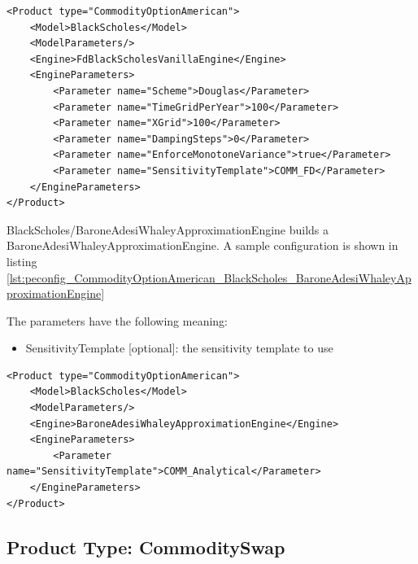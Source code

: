 \begin{longlisting}
\begin{verbatim}
<Product type="CommodityOptionAmerican">
    <Model>BlackScholes</Model>
    <ModelParameters/>
    <Engine>FdBlackScholesVanillaEngine</Engine>
    <EngineParameters>
        <Parameter name="Scheme">Douglas</Parameter>
        <Parameter name="TimeGridPerYear">100</Parameter>
        <Parameter name="XGrid">100</Parameter>
        <Parameter name="DampingSteps">0</Parameter>
        <Parameter name="EnforceMonotoneVariance">true</Parameter>
        <Parameter name="SensitivityTemplate">COMM_FD</Parameter>
    </EngineParameters>
</Product>
\end{verbatim}
\caption{Configuration for Product CommodityOptionAmerican, Model BlackScholes, Engine FdBlackScholesVanillaEngine}
\label{lst:peconfig_CommodityOptionAmerican_BlackScholes_FdBlackScholesVanillaEngine}
\end{longlisting}

BlackScholes/BaroneAdesiWhaleyApproximationEngine builds a BaroneAdesiWhaleyApproximationEngine. A sample configuration is shown in listing
\ref{lst:peconfig_CommodityOptionAmerican_BlackScholes_BaroneAdesiWhaleyApproximationEngine}

The parameters have the following meaning:

\begin{itemize}
\item SensitivityTemplate [optional]: the sensitivity template to use
\end{itemize}

\begin{longlisting}
\begin{verbatim}
<Product type="CommodityOptionAmerican">
    <Model>BlackScholes</Model>
    <ModelParameters/>
    <Engine>BaroneAdesiWhaleyApproximationEngine</Engine>
    <EngineParameters>
        <Parameter name="SensitivityTemplate">COMM_Analytical</Parameter>
    </EngineParameters>
</Product>
\end{verbatim}
\caption{Configuration for Product CommodityOptionAmerican, Model BlackScholes, Engine BaroneAdesiWhaleyApproximationEngine}
\label{lst:peconfig_CommodityOptionAmerican_BlackScholes_BaroneAdesiWhaleyApproximationEngine}
\end{longlisting}

\subsection{Product Type: CommoditySwap}

